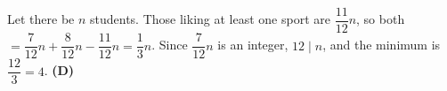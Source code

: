 Let there be $n$ students. Those liking at least one sport are $\dfrac{11}{12}n$, so both $=\dfrac7{12}n+\dfrac8{12}n-\dfrac{11}{12}n=\dfrac13n$. Since $\dfrac7{12}n$ is an integer, $12\mid n$, and the minimum is $\dfrac{12}{3}=4$. \textbf{(D)}
